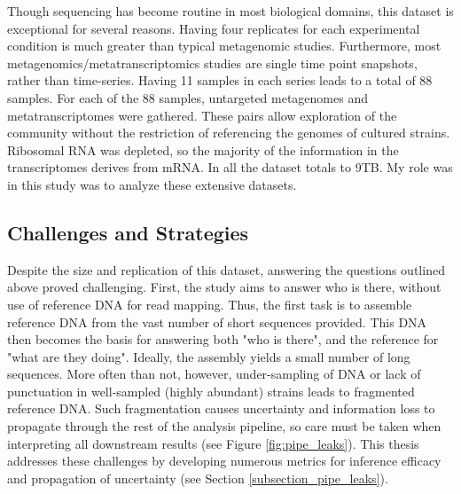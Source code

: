 Though sequencing has become routine in most biological domains, this dataset is exceptional for several reasons.
Having four replicates for each experimental condition is much greater than typical metagenomic studies.
Furthermore, most metagenomics/metatranscriptomics studies are single time point snapshots, rather than time-series.
Having 11 samples in each series leads to a total of 88 samples.
For each of the 88 samples, untargeted metagenomes and metatranscriptomes were gathered.
These pairs allow exploration of the community without the restriction of referencing the genomes of cultured strains.
Ribosomal RNA was depleted, so the majority of the information in the transcriptomes derives from mRNA.
In all the dataset totals to 9TB.
My role was in this study was to analyze these extensive datasets.

\subsection{Challenges and Strategies}  %

Despite the size and replication of this dataset, answering the questions outlined above proved challenging.
First, the study aims to answer who is there, without use of reference DNA for read mapping.  %
Thus, the first task is to assemble reference DNA from the vast number of short sequences provided.
This DNA then becomes the basis for answering both "who is there", and the reference for "what are they doing".
Ideally, the assembly yields a small number of long sequences.
More often than not, however, under-sampling of DNA or lack of punctuation in well-sampled (highly abundant) strains leads to fragmented reference DNA.
Such fragmentation causes uncertainty and information loss to propagate through the rest of the analysis pipeline, so care must be taken when interpreting all downstream results (see Figure \ref{fig:pipe_leaks}).
This thesis addresses these challenges by developing numerous metrics for inference efficacy and propagation of uncertainty (see Section \ref{subsection_pipe_leaks}).

